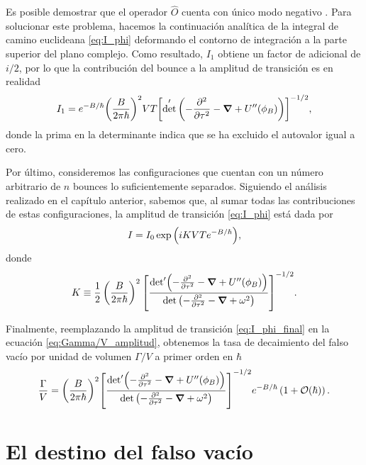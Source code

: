 Es posible demostrar que el operador $\hat{O}$ cuenta con único modo negativo %
\cite{coleman1977fate, coleman1988quantum}. Para solucionar este problema, hacemos la continuación analítica de la integral de camino euclideana \eqref{eq:I_phi} deformando el contorno de integración a la parte superior del plano complejo. Como resultado, $I_1$ obtiene un factor de adicional de $i/2$, por lo que la contribución del bounce a la amplitud de transición es en realidad 
\begin{equation}
I_1 = e^{-B / \hbar} \qty(\frac{B}{2\pi\hbar})^{2}VT \qty[ \det'\left(-\pdv[2]{\tau} -\grad{} + U''\qty(\phi_B) \right) ]^{-1/2},
\end{equation}
donde la prima en la determinante indica que se ha excluido el autovalor igual a cero. 

Por último, consideremos las configuraciones que cuentan con un número arbitrario de $n$ bounces lo suficientemente separados. Siguiendo el análisis realizado en el capítulo anterior, sabemos que, al sumar todas las contribuciones de estas configuraciones, la amplitud de transición \eqref{eq:I_phi} está dada por
\begin{equation} \label{eq:I_phi_final}
	I = I_0 \exp\qty(iKVTe^{-B/\hbar}),
\end{equation}
donde
\begin{equation}
K \equiv \frac{1}{2} \left(\frac{B}{2\pi\hbar}\right)^2 \qty[ \frac{\textrm{det}' \qty(-\pdv[2]{\tau} -\grad{} + U''\qty(\phi_B) )}{\det \qty(-\pdv[2]{\tau} -\grad{} + \omega^2 )} ]^{-1/2}.
\end{equation}

Finalmente, reemplazando la amplitud de transición \eqref{eq:I_phi_final} en la ecuación \eqref{eq:Gamma/V_amplitud}, obtenemos la tasa de decaimiento del falso vacío por unidad de volumen $\Gamma/V$ a primer orden en $\hbar$
\begin{equation} \label{eq:gamma_final_V}
\frac{\Gamma}{V} = \qty(\frac{B}{2\pi\hbar})^2  \qty[ \frac{\textrm{det}' \qty(-\pdv[2]{\tau} -\grad{} + U''\qty(\phi_B) )}{\det \qty(-\pdv[2]{\tau} -\grad{} + \omega^2 )} ]^{-1/2}e^{-B/\hbar}\left( 1 + \mathcal{O}(\hbar)\right).
\end{equation}

\section{El destino del falso vacío}


